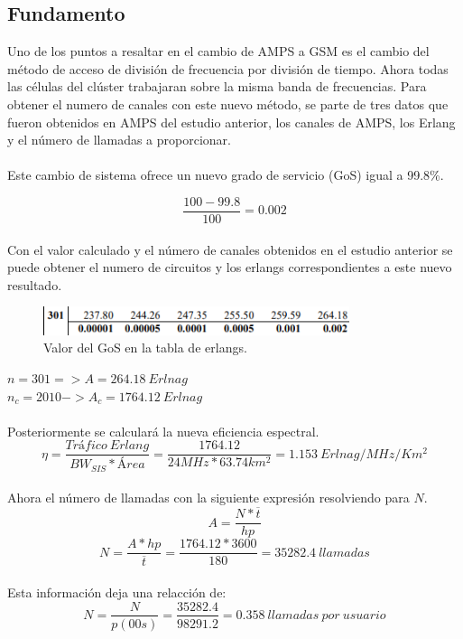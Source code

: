 \documentclass[11pt,letterpaper]{article}
\begin{document}
\subsection{Fundamento}
Uno de los puntos a resaltar en el cambio de AMPS a GSM es el cambio del 
método de acceso de división de frecuencia por división de tiempo. Ahora todas 
las células del clúster trabajaran sobre la misma banda de frecuencias. Para 
obtener el numero de canales con este nuevo método, se parte de tres datos 
que fueron obtenidos en AMPS del estudio anterior, los canales de AMPS, los 
Erlang y el número de llamadas a proporcionar.
\\ \\
Este cambio de sistema ofrece un nuevo grado de servicio (GoS) igual a 99.8\%.

\begin{equation}
    \frac{100-99.8}{100}=0.002
\end{equation}
\\
Con el valor calculado y el número de canales obtenidos en el estudio anterior se puede 
obtener el numero de circuitos y los erlangs correspondientes a este nuevo resultado.

\begin{figure}[ht]
    \centering
    \includegraphics[width=0.8\textwidth]{imagenes/erl.png}
    \caption{Valor del GoS en la tabla de erlangs.}
\end{figure}


$n=301 => A=264.18 \ Erlnag$
\\ 
$n_c=2010->A_c=1764.12 \ Erlnag$
\\ \\
Posteriormente se calculará la nueva eficiencia espectral.
\begin{equation}
    \eta=\frac{Tráfico \ Erlang}{BW_{SIS}*Área}=\frac{1764.12}{24MHz*63.74km^2}=1.153 \ Erlnag/MHz/Km^2
\end{equation}
\\
Ahora el número de llamadas con la siguiente expresión resolviendo para $N$.
\begin{equation}
    A=\frac{N*\overline{t}}{hp}
\end{equation}
\begin{equation}
    N=\frac{A*hp}{\overline{t}}=\frac{1764.12*3600}{180}=35282.4 \ llamadas
\end{equation}
\\
Esta información deja una relacción de:
\begin{equation}
    N=\frac{N}{p(00s)}=\frac{35282.4}{98291.2}=0.358 \ llamadas \ por \ usuario
\end{equation}
\end{document}
